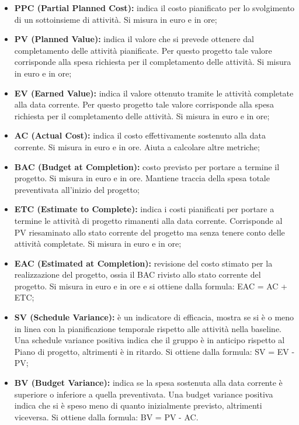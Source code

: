 		\begin{itemize}
			\item \textbf{PPC (Partial Planned Cost): }indica il costo pianificato per lo svolgimento di un sottoinsieme di attività. Si misura in euro e in ore;
			\item \textbf{PV (Planned Value): }indica il valore che si prevede ottenere dal completamento delle attività pianificate. Per questo progetto tale valore corrisponde alla spesa richiesta per il completamento delle attività. Si misura in euro e in ore;
			\item \textbf{EV (Earned Value): }indica il valore ottenuto tramite le attività completate alla data corrente. Per questo progetto tale valore corrisponde alla spesa richiesta per il completamento delle attività. Si misura in euro e in ore;
			\item \textbf{AC (Actual Cost): }indica il costo effettivamente sostenuto alla data corrente. Si misura in euro e in ore. Aiuta a calcolare altre metriche;
			\item \textbf{BAC (Budget at Completion): }costo previsto per portare a termine il progetto. Si misura in euro e in ore. Mantiene traccia della spesa totale preventivata all'inizio del progetto;
			\item \textbf{ETC (Estimate to Complete): }indica i costi pianificati per portare a termine le attività di progetto rimanenti alla data corrente. Corrisponde al PV riesaminato allo stato corrente del progetto ma senza tenere conto delle attività completate. Si misura in euro e in ore;
			\item \textbf{EAC (Estimated at Completion): }revisione del costo stimato per la realizzazione del progetto, ossia il BAC rivisto allo stato corrente del progetto. Si misura in euro e in ore e si ottiene dalla formula: EAC = AC + ETC;
			\item \textbf{SV (Schedule Variance): }è un indicatore di efficacia, mostra se si è o meno in linea con la pianificazione temporale rispetto alle attività nella baseline. Una schedule variance positiva indica che il gruppo è in anticipo rispetto al Piano di progetto, altrimenti è in ritardo. Si ottiene dalla formula: SV = EV - PV;
			\item \textbf{BV (Budget Variance): }indica se la spesa sostenuta alla data corrente è superiore o inferiore a quella preventivata. Una budget variance positiva indica che si è speso meno di quanto inizialmente previsto,  altrimenti viceversa. Si ottiene dalla formula: BV = PV - AC.
			
		\end{itemize}
		
